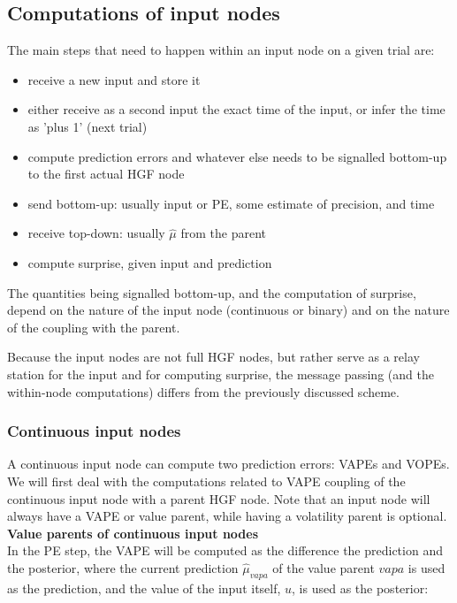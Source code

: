 \subsection{Computations of input nodes}
The main steps that need to happen within an input node on a given trial are:
\begin{itemize}
	\item receive a new input and store it
	\item either receive as a second input the exact time of the input, or infer the time as 'plus 1' (next trial)
	\item compute prediction errors and whatever else needs to be signalled bottom-up to the first actual HGF node
	\item send bottom-up: usually input or PE, some estimate of precision, and time
	\item receive top-down: usually $\hat{\mu}$ from the parent
	\item compute surprise, given input and prediction
\end{itemize}
The quantities being signalled bottom-up, and the computation of surprise, depend on the nature of the input node (continuous or binary) and on the nature of the coupling with the parent.

Because the input nodes are not full HGF nodes, but rather serve as a relay station for the input and for computing surprise, the message passing (and the within-node computations) differs from the previously discussed scheme.

\subsubsection{Continuous input nodes}
A continuous input node can compute two prediction errors: \textsf{VAPE}s and \textsf{VOPE}s. We will first deal with the computations related to \textsf{VAPE} coupling of the continuous input node with a parent HGF node. Note that an input node will always have a \textsf{VAPE} or value parent, while having a volatility parent is optional.\\

\textbf{Value parents of continuous input nodes}\\
In the \textsf{PE step}, the \textsf{VAPE} will be computed as the difference the prediction and the posterior, where the current prediction $\hat{\mu}_{vapa}$ of the value parent $vapa$ is used as the prediction, and the value of the input itself, $u$, is used as the posterior:


